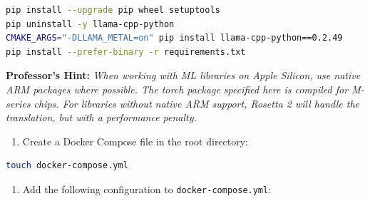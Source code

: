 \documentclass[
  screen,review,acmlarge]{acmart}
\newcommand{\passthrough}[1]{#1}
\providecommand{\tightlist}{%
  \setlength{\itemsep}{0pt}\setlength{\parskip}{0pt}}
\begin{document}
\begin{lstlisting}[language=bash]
pip install --upgrade pip wheel setuptools
pip uninstall -y llama-cpp-python
CMAKE_ARGS="-DLLAMA_METAL=on" pip install llama-cpp-python==0.2.49
pip install --prefer-binary -r requirements.txt
\end{lstlisting}

\textbf{Professor's Hint:} \emph{When working with ML libraries on Apple Silicon, use native ARM packages where possible. The torch package specified here is compiled for M-series chips. For libraries without native ARM support, Rosetta 2 will handle the translation, but with a performance penalty.}

\begin{enumerate}
\def\labelenumi{\arabic{enumi}.}
\setcounter{enumi}{5}
\tightlist
\item
  Create a Docker Compose file in the root directory:
\end{enumerate}

\begin{lstlisting}[language=bash]
touch docker-compose.yml
\end{lstlisting}

\begin{enumerate}
\def\labelenumi{\arabic{enumi}.}
\setcounter{enumi}{6}
\tightlist
\item
  Add the following configuration to \passthrough{\lstinline!docker-compose.yml!}:
\end{enumerate}
\end{document}
